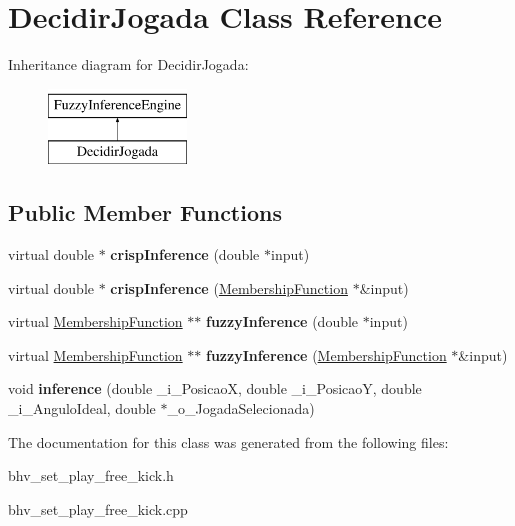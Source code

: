 \hypertarget{classDecidirJogada}{
\section{DecidirJogada Class Reference}
\label{classDecidirJogada}
}
Inheritance diagram for DecidirJogada:\begin{figure}[H]
\begin{center}
\leavevmode
\includegraphics[height=2.000000cm]{classDecidirJogada}
\end{center}
\end{figure}
\subsection*{Public Member Functions}
\begin{DoxyCompactItemize}
\item 
\hypertarget{classDecidirJogada_ad376a7bd17e06bbbee1360a1480232b6}{
virtual double $\ast$ {\bfseries crispInference} (double $\ast$input)}
\label{classDecidirJogada_ad376a7bd17e06bbbee1360a1480232b6}

\item 
\hypertarget{classDecidirJogada_a6b511946163196a8ef05094c0083edfb}{
virtual double $\ast$ {\bfseries crispInference} (\hyperlink{classMembershipFunction}{MembershipFunction} $\ast$\&input)}
\label{classDecidirJogada_a6b511946163196a8ef05094c0083edfb}

\item 
\hypertarget{classDecidirJogada_a731c97e67e808ba1aea13faa20e1b8c5}{
virtual \hyperlink{classMembershipFunction}{MembershipFunction} $\ast$$\ast$ {\bfseries fuzzyInference} (double $\ast$input)}
\label{classDecidirJogada_a731c97e67e808ba1aea13faa20e1b8c5}

\item 
\hypertarget{classDecidirJogada_ad98b457033eecc20e9364419fe58cdeb}{
virtual \hyperlink{classMembershipFunction}{MembershipFunction} $\ast$$\ast$ {\bfseries fuzzyInference} (\hyperlink{classMembershipFunction}{MembershipFunction} $\ast$\&input)}
\label{classDecidirJogada_ad98b457033eecc20e9364419fe58cdeb}

\item 
\hypertarget{classDecidirJogada_a7bf9d4d86713b5d28670319fd43bcd09}{
void {\bfseries inference} (double \_\-i\_\-PosicaoX, double \_\-i\_\-PosicaoY, double \_\-i\_\-AnguloIdeal, double $\ast$\_\-o\_\-JogadaSelecionada)}
\label{classDecidirJogada_a7bf9d4d86713b5d28670319fd43bcd09}

\end{DoxyCompactItemize}


The documentation for this class was generated from the following files:\begin{DoxyCompactItemize}
\item 
bhv\_\-set\_\-play\_\-free\_\-kick.h\item 
bhv\_\-set\_\-play\_\-free\_\-kick.cpp\end{DoxyCompactItemize}
